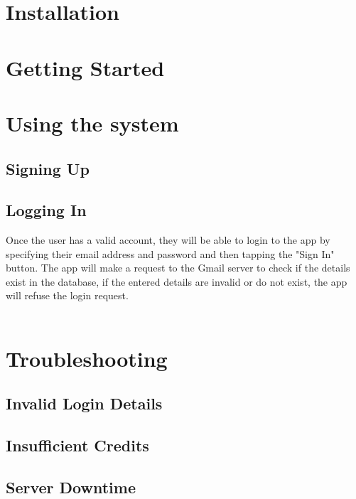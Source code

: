 \documentclass[11pt]{article}
\begin{document}
  
	
	\section{Installation}
	

	
	\section{Getting Started}


	\section{Using the system}
	\subsection{Signing Up}


	\pagebreak

	\subsection{Logging In}
	Once the user has a valid account, they will be able to login to the app by specifying their
	email address and password and then tapping the "Sign In" button. The app will make a request
	to the Gmail server to check if the details exist in the database, if the entered details are
	invalid or do not exist, the app will refuse the login request.
	\\
	\\
	
	



	\section{Troubleshooting}
	\subsection{Invalid Login Details}

	\subsection{Insufficient Credits}

	\subsection{Server Downtime}

	
\end{document}
